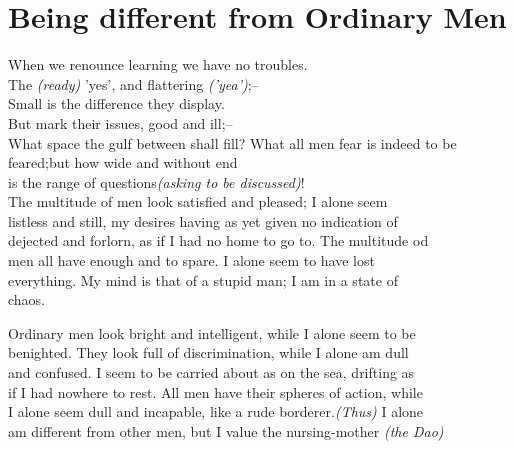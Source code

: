 \section*{Being different from Ordinary Men}
    When we renounce learning we have no troubles.\\
    The \textit{(ready)} 'yes', and flattering \textit{('yea')};--\\
    Small is the difference they display.\\
    But mark their issues, good and ill;--\\
    What space the gulf between shall fill?\vspace{\baselineskip}
    \newpage{}
    What all men fear is indeed to be feared;but how wide and without end\\
    is the range of questions\textit{(asking to be discussed)}!\\
    The multitude of men look satisfied and pleased; I alone seem\\
    listless and still, my desires having as yet given no indication of\\
    dejected and forlorn, as if I had no home to go to. The multitude od\\
    men all have enough and to spare. I alone seem to have lost\\
    everything. My mind is that of a stupid man; I am in a state of\\
    chaos.\vspace{\baselineskip}
    
    Ordinary men look bright and intelligent, while I alone seem to be\\
    benighted. They look full of discrimination, while I alone am dull\\
    and confused. I seem to be carried about as on the sea, drifting as\\
    if I had nowhere to rest. All men have their spheres of action, while\\
    I alone seem dull and incapable, like a rude borderer.\textit{(Thus)} I alone\\
    am different from other men, but I value the nursing-mother \textit{(the Dao)}\vspace{\baselineskip}
    
